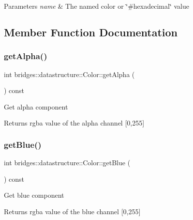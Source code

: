 \begin{DoxyParams}{Parameters}
{\em name} & The named color or \char`\"{}\#hexadecimal\char`\"{} value \\
\hline
\end{DoxyParams}


\subsection{Member Function Documentation}
\mbox{\label{classbridges_1_1datastructure_1_1_color_a07964b6c9fce8c3b4a3ba28169bf2103}} 
\subsubsection{\texorpdfstring{getAlpha()}{getAlpha()}}
{\footnotesize\ttfamily int bridges\+::datastructure\+::\+Color\+::get\+Alpha (\begin{DoxyParamCaption}{ }\end{DoxyParamCaption}) const\hspace{0.3cm}{\ttfamily [inline]}}

Get alpha component \begin{DoxyReturn}{Returns}
rgba value of the alpha channel \mbox{[}0,255\mbox{]} 
\end{DoxyReturn}
\mbox{\label{classbridges_1_1datastructure_1_1_color_a07ea27d8745ddec7834fe9ec7fca4032}} 
\subsubsection{\texorpdfstring{getBlue()}{getBlue()}}
{\footnotesize\ttfamily int bridges\+::datastructure\+::\+Color\+::get\+Blue (\begin{DoxyParamCaption}{ }\end{DoxyParamCaption}) const\hspace{0.3cm}{\ttfamily [inline]}}

Get blue component \begin{DoxyReturn}{Returns}
rgba value of the blue channel \mbox{[}0,255\mbox{]} 
\end{DoxyReturn}
\mbox{\label{classbridges_1_1datastructure_1_1_color_a4e97402d8321374a6d97327dad603341}} 
